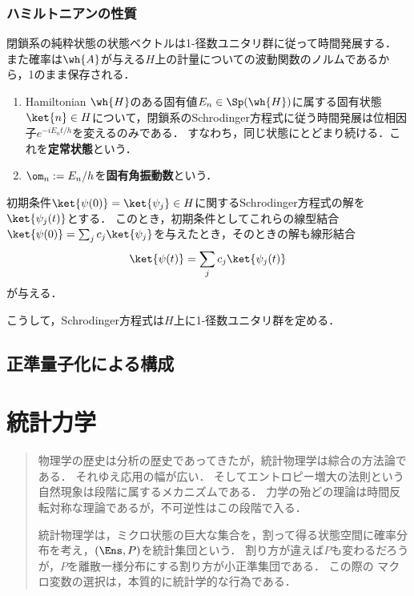 \documentclass[uplatex,dvipdfmx]{jsreport}
\begin{document}
\subsection{ハミルトニアンの性質}

\begin{tcolorbox}[colframe=ForestGreen, colback=ForestGreen!10!white,breakable,colbacktitle=ForestGreen!40!white,coltitle=black,fonttitle=\bfseries\sffamily,
title=]
    閉鎖系の純粋状態の状態ベクトルは1-径数ユニタリ群に従って時間発展する．
    また確率は$\wh{A}$が与える$H$上の計量についての波動関数のノルムであるから，1のまま保存される．
\end{tcolorbox}

\begin{definition}\mbox{}
    \begin{enumerate}
        \item Hamiltonian $\wh{H}$のある固有値$E_n\in\Sp(\wh{H})$に属する固有状態$\ket{n}\in H$について，閉鎖系のSchrodinger方程式に従う時間発展は位相因子$e^{-iE_nt/h}$を変えるのみである．
        すなわち，同じ状態にとどまり続ける．これを\textbf{定常状態}という．
        \item $\om_n:=E_n/h$を\textbf{固有角振動数}という．
    \end{enumerate}
\end{definition}

\begin{theorem}[Schrodinger方程式の線型性]
    初期条件$\ket{\psi(0)}=\ket{\psi_j}\in H$に関するSchrodinger方程式の解を$\ket{\psi_j(t)}$とする．
    このとき，初期条件としてこれらの線型結合$\ket{\psi(0)}=\sum_{j}c_j\ket{\psi_j}$を与えたとき，そのときの解も線形結合
    \[\ket{\psi(t)}=\sum_{j}c_j\ket{\psi_j(t)}\]
    が与える．
\end{theorem}
\begin{remarks}
    こうして，Schrodinger方程式は$H$上に1-径数ユニタリ群を定める．
\end{remarks}

\section{正準量子化による構成}

\chapter{統計力学}

\begin{quotation}
    物理学の歴史は分析の歴史であってきたが，統計物理学は綜合の方法論である．
    それゆえ応用の幅が広い．
    そしてエントロピー増大の法則という自然現象は段階に属するメカニズムである．
    力学の殆どの理論は時間反転対称な理論であるが，不可逆性はこの段階で入る．

    統計物理学は，ミクロ状態の巨大な集合を，割って得る状態空間に確率分布を考え，$(\Ens,P)$を統計集団という．
    割り方が違えば$P$も変わるだろうが，$P$を離散一様分布にする割り方が小正準集団である．
    この際の
    マクロ変数の選択は，本質的に統計学的な行為である．
\end{quotation}
\end{document}
